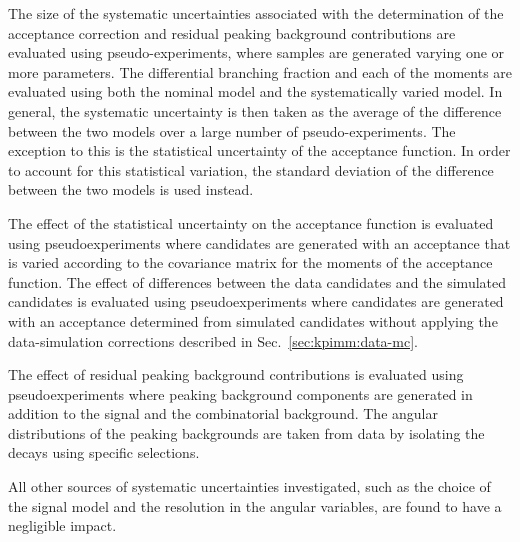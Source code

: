 The size of the systematic uncertainties associated with the determination of the acceptance correction and residual peaking background contributions are evaluated using pseudo-experiments, where samples are generated varying one or more parameters.  The differential branching fraction and each of the moments are evaluated using both the nominal model and the systematically varied model. 
In general, the systematic uncertainty is then taken as the average of the difference between the two models over a large number of pseudo-experiments. The exception to this is the statistical uncertainty of the acceptance function. In order to account for this statistical variation, the standard deviation of the difference between the two models is used instead.

The effect of the statistical uncertainty on the acceptance function is evaluated using pseudoexperiments where candidates are generated with an acceptance that is varied according to the covariance matrix for the moments of the acceptance function. The effect of differences between the data candidates and the simulated candidates is evaluated using pseudoexperiments where candidates are generated with an acceptance determined from simulated candidates without applying the data-simulation corrections described in Sec.~\ref{sec:kpimm:data-mc}.

The effect of residual peaking background contributions is evaluated using pseudoexperiments where peaking background components are generated in addition to the signal and the combinatorial background.  The angular distributions of the peaking backgrounds are taken from data by isolating the decays using specific selections.

All other sources of systematic uncertainties investigated, such as the choice of the \mkpimm signal model and the resolution in the angular variables, are found to have a negligible impact.
